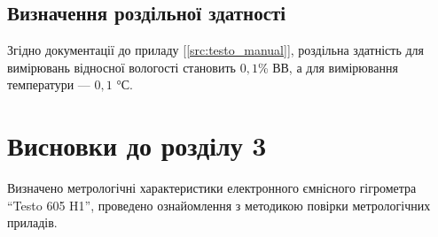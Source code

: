 \subsection{Визначення роздільної здатності}

Згідно документації до приладу [\ref{src:testo_manual}], роздільна здатність для вимірювань відносної вологості становить
$0,1$\% ВВ, а для вимірювання температури --- $0,1$ °С.

\newpage
\section*{Висновки до розділу 3}

Визначено метрологічні характеристики електронного ємнісного гігрометра ``Testo 605 H1'', проведено
ознайомлення з методикою повірки метрологічних приладів.
